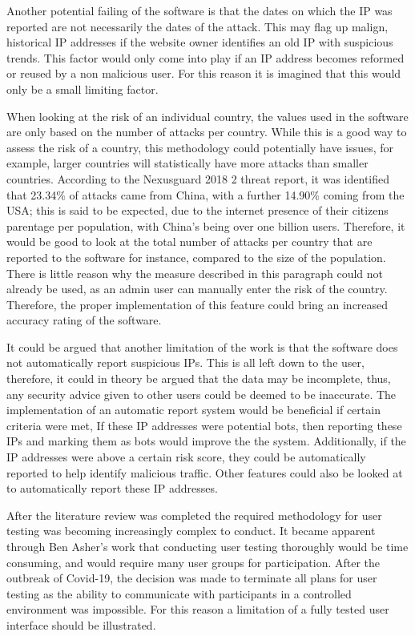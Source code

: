 Another potential failing of the software is that the dates on which the IP was reported are not necessarily the dates of the attack. This may flag up malign, historical IP addresses if the website owner identifies an old IP with suspicious trends. This factor would only come into play if an IP address becomes reformed or reused by a non malicious user. For this reason it is imagined that this would only be a small limiting factor.

When looking at the risk of an individual country, the values used in the software are only based on the number of attacks per country. While this is a good way to assess the risk of a country, this methodology could potentially have issues, for example, larger countries will statistically have more attacks than smaller countries. According to the Nexusguard 2018 2 threat report, it was identified that 23.34\% of attacks came from China, with a further 14.90\% coming from the USA; this is said to be expected, due to the internet presence of their citizens parentage per population, with China's being over one billion users. Therefore, it would be good to look at the total number of attacks per country that are reported to the software for instance, compared to the size of the population. There is little reason why the measure described in this paragraph could not already be used, as an admin user can manually enter the risk of the country. Therefore, the proper implementation of this feature could bring an increased accuracy rating of the software. 

It could be argued that another limitation of the work is that the software does not automatically report suspicious IPs. This is all left down to the user, therefore, it could in theory be argued that the data may be incomplete, thus, any security advice given to other users could be deemed to be inaccurate. The implementation of an automatic report system would be beneficial if certain criteria were met, If these IP addresses were potential bots, then reporting these IPs and marking them as bots would improve the the system. Additionally, if the IP addresses were above a certain risk score, they could be automatically reported to help identify malicious traffic. Other features could also be looked at to automatically report these IP addresses.

After the literature review was completed the required methodology for user testing was becoming increasingly complex to conduct. It became apparent through Ben Asher's work that conducting user testing thoroughly would be time consuming, and would require many user groups for participation. After the outbreak of Covid-19, the decision was made to terminate all plans for user testing as the ability to communicate with participants in a controlled environment was impossible. For this reason a limitation of a fully tested user interface should be illustrated. 